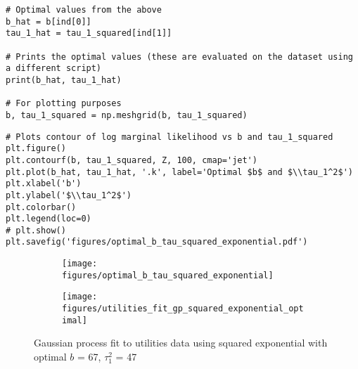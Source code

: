 \documentclass[10pt]{article}
\begin{document}
\begin{enumerate}[label=(\Alph*)]
\begin{lstlisting}
# Optimal values from the above
b_hat = b[ind[0]]
tau_1_hat = tau_1_squared[ind[1]]

# Prints the optimal values (these are evaluated on the dataset using a different script)
print(b_hat, tau_1_hat)

# For plotting purposes
b, tau_1_squared = np.meshgrid(b, tau_1_squared)
        \end{lstlisting}

        \begin{lstlisting}
# Plots contour of log marginal likelihood vs b and tau_1_squared
plt.figure()
plt.contourf(b, tau_1_squared, Z, 100, cmap='jet')
plt.plot(b_hat, tau_1_hat, '.k', label='Optimal $b$ and $\\tau_1^2$')
plt.xlabel('b')
plt.ylabel('$\\tau_1^2$')
plt.colorbar()
plt.legend(loc=0)
# plt.show()
plt.savefig('figures/optimal_b_tau_squared_exponential.pdf')
        \end{lstlisting}

            \begin{figure}
                \begin{subfigure}{.5\textwidth}
                  \centering
                  \texttt{[image: figures/optimal\_b\_tau\_squared\_exponential]}
                \end{subfigure}%
                \begin{subfigure}{.5\textwidth}
                  \centering
                  \texttt{[image: figures/utilities\_fit\_gp\_squared\_exponential\_optimal]}
                \end{subfigure}
            \caption{Gaussian process fit to utilities data using squared exponential with optimal $b$ = 67, $\tau_1^2$ = 47}
            \label{fig:gp_fit_utilities_optimal}
            \end{figure}


\end{enumerate}
\end{document}
